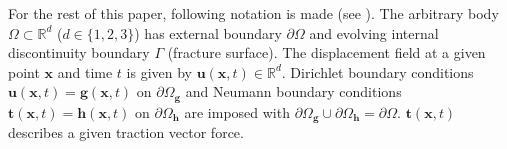 For the rest of this paper, following notation is made (see ). The arbitrary body $\Omega\subset\mathbb{R}^{d}$ ($d\in\{1,2,3\}$) has external boundary $\partial\Omega$ and evolving internal discontinuity boundary $\Gamma$ (fracture surface). The displacement field at a given point $\mathbf{x}$ and time $t$ is given by $\mathbf{u}\left(\mathbf{x},t\right)\in\mathbb{R}^{d}$. Dirichlet boundary conditions $\mathbf{u}\left(\mathbf{x},t\right)=\mathbf{g}\left(\mathbf{x},t\right)$ on $\partial\Omega_{\mathbf{g}}$ and Neumann boundary conditions $\mathbf{t}\left(\mathbf{x},t\right)=\mathbf{h}\left(\mathbf{x},t\right)$ on $\partial\Omega_{\mathbf{h}}$ are imposed with $\partial\Omega_{\mathbf{g}}\cup\partial\Omega_{\mathbf{h}}=\partial\Omega$. $\mathbf{t}\left(\mathbf{x},t\right)$ describes a given traction vector force.

